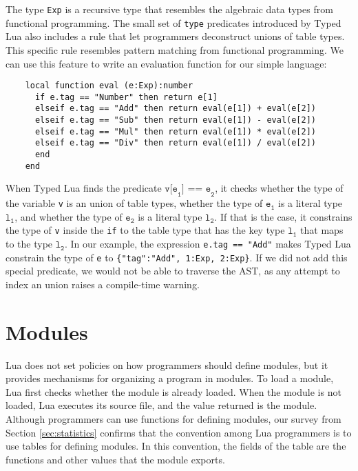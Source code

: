 The type \texttt{Exp} is a recursive type that resembles the
algebraic data types from functional programming.
The small set of \texttt{type} predicates introduced by
Typed Lua also includes a rule that let programmers
deconstruct unions of table types.
This specific rule resembles pattern matching from functional programming.
We can use this feature to write an evaluation function for
our simple language:
\begin{verbatim}
    local function eval (e:Exp):number
      if e.tag == "Number" then return e[1]
      elseif e.tag == "Add" then return eval(e[1]) + eval(e[2])
      elseif e.tag == "Sub" then return eval(e[1]) - eval(e[2])
      elseif e.tag == "Mul" then return eval(e[1]) * eval(e[2])
      elseif e.tag == "Div" then return eval(e[1]) / eval(e[2])
      end
    end
\end{verbatim}

When Typed Lua finds the predicate $\texttt{v[e}_{\texttt{1}}\texttt{] == e}_{\texttt{2}}$,
it checks whether the type of the variable \texttt{v} is an union of table types,
whether the type of $\texttt{e}_{\texttt{1}}$ is a literal type $\texttt{l}_{\texttt{1}}$,
and whether the type of $\texttt{e}_{\texttt{2}}$ is a literal type $\texttt{l}_{\texttt{2}}$.
If that is the case, it constrains the type of \texttt{v} inside
the \texttt{if} to the table type that has the key type
$\texttt{l}_{\texttt{1}}$ that maps to the type $\texttt{l}_{\texttt{2}}$.
In our example, the expression \texttt{e.tag == "Add"} makes Typed Lua
constrain the type of \texttt{e} to \texttt{\{"tag":"Add", 1:Exp, 2:Exp\}}.
If we did not add this special predicate, we would not be able to traverse the AST,
as any attempt to index an union raises a compile-time warning.

\section{Modules}
\label{sec:modules}

Lua does not set policies on how programmers should define modules,
but it provides mechanisms for organizing a program in modules.
To load a module, Lua first checks whether the module is already loaded.
When the module is not loaded, Lua executes its source file, and
the value returned is the module.
Although programmers can use functions for defining modules,
our survey from Section \ref{sec:statistics} confirms that
the convention among Lua programmers is to use tables for defining modules. 
In this convention, the fields of the table are the functions and other
values that the module exports.

